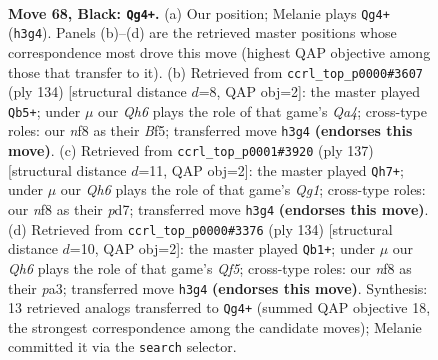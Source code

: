 \documentclass[11pt]{article}
\begin{document}
\clearpage

\begin{figure}[p]\centering
\begin{subfigure}{0.46\textwidth}\centering
\resizebox{\linewidth}{!}{%
\newchessgame
\chessboard[
  setfen={5N2/1Q4K1/8/k7/8/7q/8/8 b - - 6 68},
  showmover=false,
  pgfstyle=straightmove, color=movearrow, markmove={h3-g4}
]}
\caption{}
\end{subfigure}\hfill
\begin{subfigure}{0.46\textwidth}\centering
\resizebox{\linewidth}{!}{%
\newchessgame
\chessboard[
  setfen={1k1q4/5K2/8/5B2/Q7/8/8/8 w - - 5 68},
  showmover=false,
  pgfstyle=straightmove, color=movearrow, markmove={a4-b5}
]}
\caption{}
\end{subfigure}
\\[4pt]
\begin{subfigure}{0.46\textwidth}\centering
\resizebox{\linewidth}{!}{%
\newchessgame
\chessboard[
  setfen={6q1/1k1PK3/8/4Q3/p7/8/8/8 b - - 8 69},
  showmover=false,
  pgfstyle=straightmove, color=movearrow, markmove={g8-h7}
]}
\caption{}
\end{subfigure}\hfill
\begin{subfigure}{0.46\textwidth}\centering
\resizebox{\linewidth}{!}{%
\newchessgame
\chessboard[
  setfen={8/8/3q4/5Q2/1k5P/p7/6K1/8 w - - 4 68},
  showmover=false,
  pgfstyle=straightmove, color=movearrow, markmove={f5-b1}
]}
\caption{}
\end{subfigure}
\caption{\textbf{Move 68, Black: \texttt{Qg4+}.} (a) Our position; Melanie plays \texttt{Qg4+} (\texttt{h3g4}). Panels (b)--(d) are the retrieved master positions whose correspondence most drove this move (highest QAP objective among those that transfer to it). (b) Retrieved from \texttt{ccrl\_top\_p0000\#3607} (ply 134) [structural distance $d$=8, QAP obj=2]: the master played \texttt{Qb5+}; under $\mu$ our \emph{Qh6} plays the role of that game's \emph{Qa4}; cross-type roles: our \emph{n}f8 as their \emph{B}f5; transferred move \texttt{h3g4} \textbf{(endorses this move)}. (c) Retrieved from \texttt{ccrl\_top\_p0001\#3920} (ply 137) [structural distance $d$=11, QAP obj=2]: the master played \texttt{Qh7+}; under $\mu$ our \emph{Qh6} plays the role of that game's \emph{Qg1}; cross-type roles: our \emph{n}f8 as their \emph{p}d7; transferred move \texttt{h3g4} \textbf{(endorses this move)}. (d) Retrieved from \texttt{ccrl\_top\_p0000\#3376} (ply 134) [structural distance $d$=10, QAP obj=2]: the master played \texttt{Qb1+}; under $\mu$ our \emph{Qh6} plays the role of that game's \emph{Qf5}; cross-type roles: our \emph{n}f8 as their \emph{p}a3; transferred move \texttt{h3g4} \textbf{(endorses this move)}. Synthesis: 13 retrieved analogs transferred to \texttt{Qg4+} (summed QAP objective 18, the strongest correspondence among the candidate moves); Melanie committed it via the \texttt{search} selector.}
\label{fig:thought-m135}
\end{figure}
\end{document}
